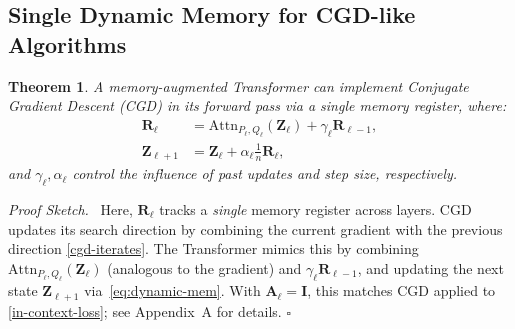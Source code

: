 \documentclass[11pt]{article}
\theoremstyle{plain}
\newtheorem{theorem}{Theorem}[section]
\theoremstyle{definition}
\theoremstyle{remark}
\newenvironment{proofsketch}{\par\noindent\textit{Proof Sketch.}\ }{\hfill$\square$\par}
\numberwithin{equation}{section}
\begin{document}
\subsection{Single Dynamic Memory for CGD-like Algorithms}
\label{Sec:dynamic-mem}
\begin{theorem}\label{Proposition 1}
A memory-augmented Transformer can implement Conjugate Gradient Descent (CGD) in its forward pass via a single memory register, where:
\begin{align}
    \mathbf{R}_\ell &= \mathrm{Attn}_{P_\ell, Q_\ell}(\mathbf{Z}_\ell) + \gamma_\ell \mathbf{R}_{\ell-1}, \label{eq:dynamic-mem_update}\\
    \mathbf{Z}_{\ell+1} &= \mathbf{Z}_\ell + \alpha_\ell \frac{1}{n} \mathbf{R}_\ell, \label{eq:dynamic-mem}
\end{align}
and \(\gamma_\ell, \alpha_\ell\) control the influence of past updates and step size, respectively.
\end{theorem}
\begin{proofsketch}
Here, \(\mathbf{R}_\ell\) tracks a \emph{single} memory register across layers. CGD updates its search direction by combining the current gradient with the previous direction \eqref{cgd-iterates}. The Transformer mimics this by combining \(\mathrm{Attn}_{P_\ell, Q_\ell}(\mathbf{Z}_\ell)\) (analogous to the gradient) and \(\gamma_\ell \mathbf{R}_{\ell-1}\), and updating the next state \(\mathbf{Z}_{\ell+1}\) via~\eqref{eq:dynamic-mem}. %
With \(\mathbf{A}_\ell = \mathbf{I}\), this matches CGD applied to \eqref{in-context-loss}; see Appendix~A for details. %
\end{proofsketch}
\end{document}
